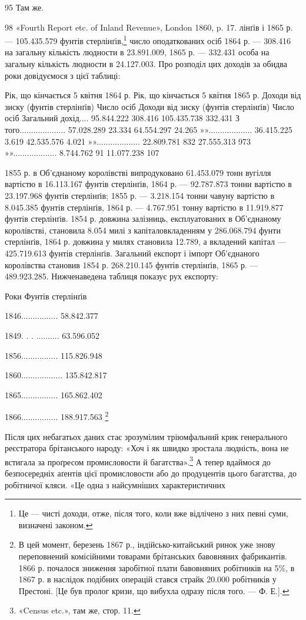 95    Там же.

98 «Fourth Report etc. of Inland Revenue», London 1860, p. 17.
лінґів і 1865 р. — 105.435.579 фунтів стерлінґів,\footnote{
Це — чисті доходи, отже, після того, коли вже відлічено з них
певні суми, визначені законом.
} число оподаткованих
осіб 1864 р. — 308.416 на загальну кількість людности в
23.891.009, 1865 р. — 332.431 особа на загальну кількість людности
в 24.127.003. Про розподіл цих доходів за обидва роки
довідуємося з цієї таблиці:

    Рік, що кінчається 5 квітня 1864 р. Рік, що кінчається 5 квітня 1865 р.
    Доходи від зиску (фунтів стерлінґів) Число  осіб    Доходи від зиску (фунтів стерлінґів) Число
осіб
Загальний дохід....  95.844.222   308.416   105.435.738   332.431
З того....................  57.028.289   23.334      64.554.297     24.265
»»...................  36.415.225   3.619        42.535.576     4.021
»»...................  22.809.781   832           27.555.313     973
»»...................  8.744.762      91             11.077.238     107

1855 р. в Об’єднаному королівстві випродуковано 61.453.079
тонн вугілля вартістю в 16.113.167 фунтів стерлінґів, 1864 р. —
92.787.873 тонни вартістю в 23.197.968 фунтів стерлінґів; 1855 р. —
3.218.154 тонни чавуну вартістю в 8.045.385 фунтів стерлінґів,
1864 р. — 4.767.951 тонну вартістю в 11.919.877 фунтів стерлінґів.
1854 р. довжина залізниць, експлуатованих в Об’єднаному
королівстві, становила 8.054 милі з капіталовкладенням
у 286.068.794 фунти стерлінґів, 1864 р. довжина у милях становила
12.789, а вкладений капітал — 425.719.613 фунтів стерлінґів.
Загальний експорт і імпорт Об’єднаного королівства
становив 1854 р. 268.210.145 фунтів стерлінґів, 1865 р. —
489.923.285. Нижченаведена таблиця показує рух експорту:

Роки    Фунтів стерлінґів

1846................ 58.842.377

1849. . . .......... 63.596.052

1856................ 115.826.948

1860.................. 135.842.817

1865................ 165.862.402

1866................ 188.917.563 \footnote{
В цей момент, березень 1867 р., індійсько-китайський ринок
уже знову переповнений комісійними товарами брітанських бавовняних
фабрикантів. 1866 р. почалося зниження заробітної плати бавовняних
робітників на 5\%, в 1867 р. в наслідок подібних операцій стався страйк
20.000 робітників у Престоні. [Це був пролог кризи, що вибухла одразу
після того. — Ф. Е.].
}

Після цих небагатьох даних стає зрозумілим тріюмфальний
крик генерального реєстратора брітанського народу: «Хоч і
як швидко зростала людність, вона не встигала за проґресом промисловости
й багатства».\footnote{
«Census etc.», там же, стор. 11.
} А тепер вдаймося до безпосередніх
аґентів цієї промисловости або до продуцентів цього багатства,
до робітничої кляси. «Це одна з найсумніших характеристичних
\parbreak{}  %
